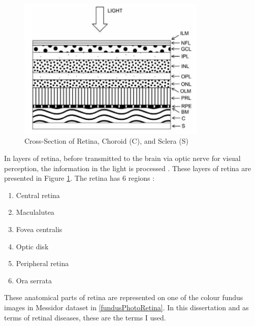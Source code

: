 \begin{figure}[t]
\centering
\includegraphics[width=0.8\textwidth]{Figures/layers_of_retina}
\caption{Cross-Section of Retina, Choroid (C), and Sclera (S) \citep[from][]{falt2012modern}}
\label{layersOfRetina}
\end{figure}


In layers of retina, before transmitted to the brain via optic nerve for visual perception, the information in the light is processed \citep{kauppi2010eye}. These layers of retina are presented in Figure \ref{layersOfRetina}. The retina has 6 regions \citep{forrester2015eye}:

\begin{enumerate}
    \item Central retina
    \item Maculalutea
    \item Fovea centralis
    \item Optic disk
    \item Peripheral retina
    \item Ora serrata
\end{enumerate}

These anatomical parts of retina are represented on one of the colour fundus images in Messidor dataset \citep{mookiah2015application} in \ref{fundusPhotoRetina}. In this dissertation and as terms of retinal diseases, these are the terms I used. 

